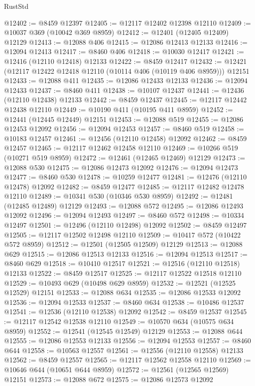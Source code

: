 \begin{lexlean}{RustStd}
\begin{coremodule}
@12402 := @8459 @12397
@12405 := @12117 @12402 @12398 @12110
@12409 := @10037 @369 (@10042 @369 @8959)
@12412 := @12401 (@12405 @12409) @12129
@12413 := @12088 @406
@12415 := @12086 @12413 @12133
@12416 := @12094 @12413
@12417 := @8460 @406
@12418 := @10030 @12417
@12421 := @12416 (@12110 @12418) @12133
@12422 := @8459 @12417
@12432 := @12421 (@12117 @12422 @12418 @12110 (@10114 @406 (@10119 @406 @8959))) @12151
@12433 := @12088 @411
@12435 := @12086 @12433 @12133
@12436 := @12094 @12433
@12437 := @8460 @411
@12438 := @10107 @12437
@12441 := @12436 (@12110 @12438) @12133
@12442 := @8459 @12437
@12445 := @12117 @12442 @12438 @12110
@12449 := @10190 @411 (@10195 @411 @8959)
@12452 := @12441 (@12445 @12449) @12151
@12453 := @12088 @519
@12455 := @12086 @12453 @12092
@12456 := @12094 @12453
@12457 := @8460 @519
@12458 := @10183 @12457
@12461 := @12456 (@12110 @12458) @12092
@12462 := @8459 @12457
@12465 := @12117 @12462 @12458 @12110
@12469 := @10266 @519 (@10271 @519 @8959)
@12472 := @12461 (@12465 @12469) @12129
@12473 := @12088 @530
@12475 := @12086 @12473 @12092
@12476 := @12094 @12473
@12477 := @8460 @530
@12478 := @10259 @12477
@12481 := @12476 (@12110 @12478) @12092
@12482 := @8459 @12477
@12485 := @12117 @12482 @12478 @12110
@12489 := @10341 @530 (@10346 @530 @8959)
@12492 := @12481 (@12485 @12489) @12129
@12493 := @12088 @572
@12495 := @12086 @12493 @12092
@12496 := @12094 @12493
@12497 := @8460 @572
@12498 := @10334 @12497
@12501 := @12496 (@12110 @12498) @12092
@12502 := @8459 @12497
@12505 := @12117 @12502 @12498 @12110
@12509 := @10417 @572 (@10422 @572 @8959)
@12512 := @12501 (@12505 @12509) @12129
@12513 := @12088 @629
@12515 := @12086 @12513 @12133
@12516 := @12094 @12513
@12517 := @8460 @629
@12518 := @10410 @12517
@12521 := @12516 (@12110 @12518) @12133
@12522 := @8459 @12517
@12525 := @12117 @12522 @12518 @12110
@12529 := @10493 @629 (@10498 @629 @8959)
@12532 := @12521 (@12525 @12529) @12151
@12533 := @12088 @634
@12535 := @12086 @12533 @12092
@12536 := @12094 @12533
@12537 := @8460 @634
@12538 := @10486 @12537
@12541 := @12536 (@12110 @12538) @12092
@12542 := @8459 @12537
@12545 := @12117 @12542 @12538 @12110
@12549 := @10570 @634 (@10575 @634 @8959)
@12552 := @12541 (@12545 @12549) @12129
@12553 := @12088 @644
@12555 := @12086 @12553 @12133
@12556 := @12094 @12553
@12557 := @8460 @644
@12558 := @10563 @12557
@12561 := @12556 (@12110 @12558) @12133
@12562 := @8459 @12557
@12565 := @12117 @12562 @12558 @12110
@12569 := @10646 @644 (@10651 @644 @8959)
@12572 := @12561 (@12565 @12569) @12151
@12573 := @12088 @672
@12575 := @12086 @12573 @12092

\end{coremodule}
\end{lexlean}
